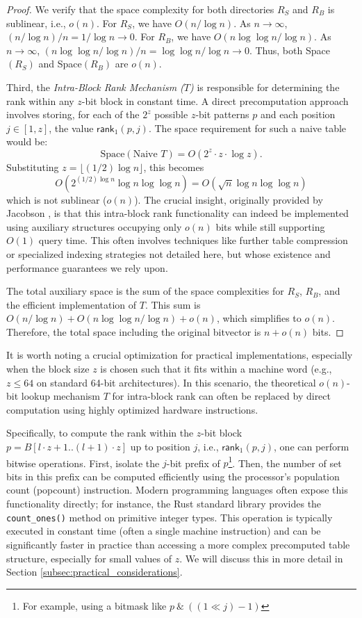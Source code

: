 \begin{proof}
    We verify that the space complexity for both directories $R_S$ and $R_B$ is sublinear, i.e., $o(n)$. For $R_S$, we have $O(n / \log n)$. As $n \to \infty$, $(n / \log n) / n = 1 / \log n \to 0$. For $R_B$, we have $O(n \log \log n / \log n)$. As $n \to \infty$, $(n \log \log n / \log n) / n = \log \log n / \log n \to 0$. Thus, both Space$(R_S)$ and Space$(R_B)$ are $o(n)$.

    Third, the \emph{Intra-Block Rank Mechanism ($T$)} is responsible for determining the rank within any $z$-bit block in constant time. A direct precomputation approach involves storing, for each of the $2^z$ possible $z$-bit patterns $p$ and each position $j \in [1, z]$, the value $\textsf{rank}_1(p, j)$. The space requirement for such a naive table would be:
    \[ \text{Space}(\text{Naive } T) = O(2^z \cdot z \cdot \log z). \]
    Substituting $z = \lfloor (1/2) \log n \rfloor$, this becomes
    \[ O(2^{(1/2)\log n} \log n \log \log n) = O(\sqrt{n} \log n \log \log n) \]
    which is not sublinear ($o(n)$). The crucial insight, originally provided by Jacobson \cite{Jacobson}, is that this intra-block rank functionality can indeed be implemented using auxiliary structures occupying only $o(n)$ bits while still supporting $O(1)$ query time. This often involves techniques like further table compression or specialized indexing strategies not detailed here, but whose existence and performance guarantees we rely upon.

    The total auxiliary space is the sum of the space complexities for $R_S$, $R_B$, and the efficient implementation of $T$. This sum is $O(n / \log n) + O(n \log \log n / \log n) + o(n)$, which simplifies to $o(n)$. Therefore, the total space including the original bitvector is $n + o(n)$ bits.
\end{proof}

It is worth noting a crucial optimization for practical implementations, especially when the block size $z$ is chosen such that it fits within a machine word (e.g., $z \le 64$ on standard 64-bit architectures). In this scenario, the theoretical $o(n)$-bit lookup mechanism $T$ for intra-block rank can often be replaced by direct computation using highly optimized hardware instructions.

Specifically, to compute the rank within the $z$-bit block $p = B[l \cdot z + 1 .. (l+1) \cdot z]$ up to position $j$, i.e., $\textsf{rank}_1(p, j)$, one can perform bitwise operations. First, isolate the $j$-bit prefix of $p$\footnote{For example, using a bitmask like $p \ \& \ ((1 \ll j) - 1)$}. Then, the number of set bits in this prefix can be computed efficiently using the processor's population count (popcount) instruction. Modern programming languages often expose this functionality directly; for instance, the Rust standard library provides the \texttt{count\_ones()} method on primitive integer types. This operation is typically executed in constant time (often a single machine instruction) and can be significantly faster in practice than accessing a more complex precomputed table structure, especially for small values of $z$.  We will discuss this in more detail in Section \ref{subsec:practical_considerations}.

